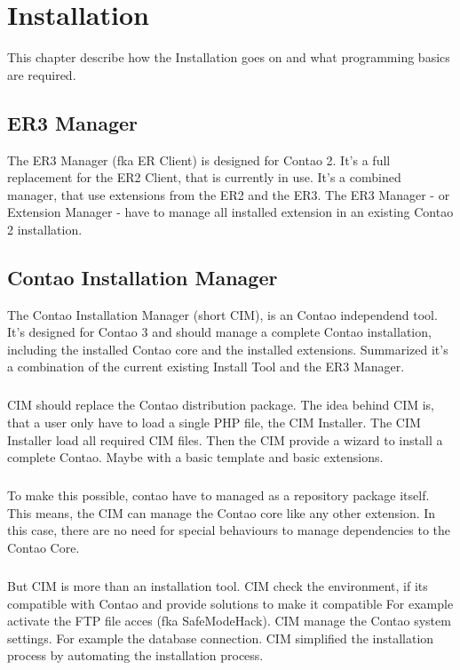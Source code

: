 \chapter{Installation}

This chapter describe how the Installation goes on and what programming basics are required.

\section[sec:er3 manager]{ER3 Manager}

The ER3 Manager (fka ER Client) is designed for Contao 2. It's a full replacement for the ER2 Client, that is currently in use.
It's a combined manager, that use extensions from the ER2 and the ER3. The ER3 Manager - or Extension Manager - have to manage all installed extension in an existing Contao 2 installation.

\section[sec:conatao installation manager]{Contao Installation Manager}

The Contao Installation Manager (short CIM), is an Contao independend tool. It's designed for Contao 3 and should manage a complete Contao installation, including the installed Contao core and the installed extensions.
Summarized it's a combination of the current existing Install Tool and the ER3 Manager.

\paragraph{}
CIM should replace the Contao distribution package.
The idea behind CIM is, that a user only have to load a single PHP file, the CIM Installer.
The CIM Installer load all required CIM files.
Then the CIM provide a wizard to install a complete Contao.
Maybe with a basic template and basic extensions.

\paragraph{}
To make this possible, contao have to managed as a repository package itself.
This means, the CIM can manage the Contao core like any other extension.
In this case, there are no need for special behaviours to manage dependencies to the Contao Core.

\paragraph{}
But CIM is more than an installation tool.
CIM check the environment, if its compatible with Contao and provide solutions to make it compatible
For example activate the FTP file acces (fka SafeModeHack).
CIM manage the Contao system settings.
For example the database connection.
CIM simplified the installation process by automating the installation process.

